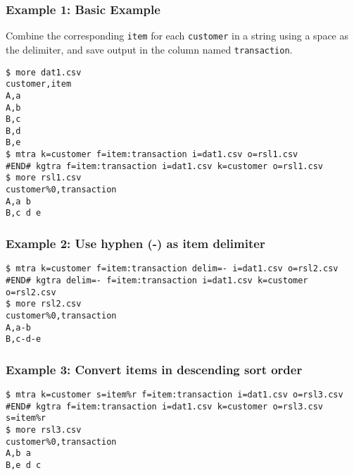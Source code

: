 \subsubsection*{Example 1: Basic Example}

Combine the corresponding \verb|item| for each \verb|customer| in a string using a space as the delimiter, and save output in the column named \verb|transaction|.


\begin{Verbatim}[baselinestretch=0.7,frame=single]
$ more dat1.csv
customer,item
A,a
A,b
B,c
B,d
B,e
$ mtra k=customer f=item:transaction i=dat1.csv o=rsl1.csv
#END# kgtra f=item:transaction i=dat1.csv k=customer o=rsl1.csv
$ more rsl1.csv
customer%0,transaction
A,a b
B,c d e
\end{Verbatim}
\subsubsection*{Example 2: Use hyphen (-) as item delimiter}



\begin{Verbatim}[baselinestretch=0.7,frame=single]
$ mtra k=customer f=item:transaction delim=- i=dat1.csv o=rsl2.csv
#END# kgtra delim=- f=item:transaction i=dat1.csv k=customer o=rsl2.csv
$ more rsl2.csv
customer%0,transaction
A,a-b
B,c-d-e
\end{Verbatim}
\subsubsection*{Example 3: Convert items in descending sort order}



\begin{Verbatim}[baselinestretch=0.7,frame=single]
$ mtra k=customer s=item%r f=item:transaction i=dat1.csv o=rsl3.csv
#END# kgtra f=item:transaction i=dat1.csv k=customer o=rsl3.csv s=item%r
$ more rsl3.csv
customer%0,transaction
A,b a
B,e d c
\end{Verbatim}
